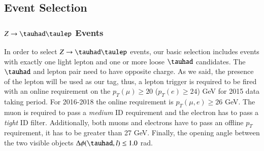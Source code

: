 \subsection{Event Selection}\label{sec3.3}
\subsubsection{$Z\to\tauhad\taulep$ Events}\label{sec3.3.1}
In order to select $Z\to\tauhad\taulep$ events, our basic selection includes events with exactly one light lepton and one or more loose $\tauhad$ candidates. The $\tauhad$ and lepton pair need to have opposite charge. As we said, the presence of the lepton will be used as our tag, thus, a lepton trigger is required to be fired with an online requirement on the $p_{T}(\mu)\geq 20$ ($p_{T}(e)\geq 24$) GeV for 2015 data taking period. For 2016-2018 the online requirement is $p_{T}(\mu,e)\geq 26$ GeV. The muon is required to pass a \textit{medium} ID requirement and the electron has to pass a \textit{tight} ID filter. Additionally, both muons and electrons have to pass an offline $p_T$ requirement, it has to be greater than 27 GeV. Finally, the opening angle between the two visible objects $\Delta\phi(\tauhad,l)\leq 1.0$ rad.

